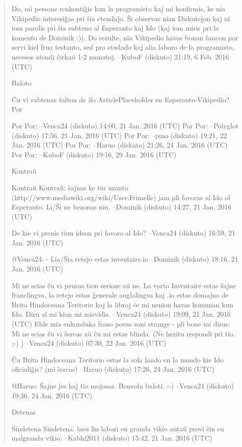 \begin{quote}
    Do, mi persone renkontiĝis kun la programisto kaj mi konfirmis, ke nia Vikipedio interesiĝas pri ŝia etendaĵo. Ŝi observas nian Diskutejon kaj ni iom parolis pri ŝia subteno al Esperanto kaj Ido (kaj iom miris pri la komento de Dominik :)). Do rezulte, nia Vikipedio havas bonan ŝancon por servi kiel frua testanto, sed pro studado kaj alia laboro de la programisto, necesos atendi ĉirkaŭ 1-2 monatoj. --KuboF (diskuto) 21:19, 6 Feb. 2016 (UTC)

Baloto

Ĉu vi subtenas ŝalton de ilo ArticlePlaceholder en Esperanto-Vikipedio?
Por

    Por Por: --Venca24 (diskuto) 14:00, 21 Jan. 2016 (UTC)
    Por Por: --Polyglot (diskuto) 17:56, 21 Jan. 2016 (UTC)
    Por Por: --pino (diskuto) 19:21, 22 Jan. 2016 (UTC)
    Por Por: --Haruo (diskuto) 21:26, 24 Jan. 2016 (UTC)
    Por Por: --KuboF (diskuto) 19:16, 29 Jan. 2016 (UTC)

Kontraŭ

    Kontraŭ Kontraŭ: ŝajnas ke tiu uzanto (http://www.mediawiki.org/wiki/User:Frimelle) jam pli favoras al Ido ol Esperanto. Li/Ŝi ne bezonas nin. --Dominik (diskuto) 14:27, 21 Jan. 2016 (UTC)

    De kie vi prenis tiun ideon pri favoro al Ido? --Venca24 (diskuto) 16:59, 21 Jan. 2016 (UTC)

        @Venca24: - Lia/Ŝia retejo estas inventaire.io --Dominik (diskuto) 18:16, 21 Jan. 2016 (UTC)

            Mi ne scias ĉu vi pensas tion serioze aŭ ne. La vorto Inventaire estas ŝajne franclingva, la retejo estas ĝenerale anglalingva kaj .io estas domajno de Brita Hindoceana Teritorio kaj la libroj ĉe mi nenion havas komunan kun Ido. Diru al mi kion mi misvidis. --Venca24 (diskuto) 19:09, 21 Jan. 2016 (UTC)
            Eble mia enkonduka frazo povas soni strange - pli bone mi dirus: Mi ne scias ĉu vi ŝercas aŭ ĉu mi estas blinda. (Ne hezitu respondi pri tio. ;-) ) --Venca24 (diskuto) 07:30, 22 Jan. 2016 (UTC)

                Ĉu Brita Hindoceana Teritorio estas la sola lando en la mondo kie Ido oficialiĝis? (mi ŝercas) --Haruo (diskuto) 17:26, 24 Jan. 2016 (UTC)

                    @Haruo: Ŝajne jes kaj tio mojosas. Bonvolu baloti. :-) --Venca24 (diskuto) 19:36, 24 Jan. 2016 (UTC)

Detenas

    Sindetena Sindetena: lasu lin labori en granda vikio antaŭ provi ŝin en malgranda vikio. --Kabhi2011 (diskuto) 15:42, 21 Jan. 2016 (UTC)

\end{quote}

